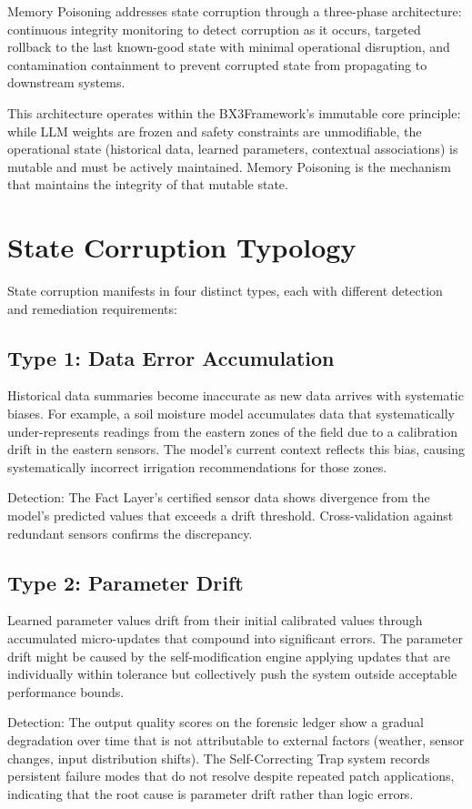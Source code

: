\documentclass[12pt]{article}
\def\bxthree{BX3}
\begin{document}
Memory Poisoning addresses state corruption through a three-phase architecture: continuous integrity monitoring to detect corruption as it occurs, targeted rollback to the last known-good state with minimal operational disruption, and contamination containment to prevent corrupted state from propagating to downstream systems.

This architecture operates within the \bxthree Framework's immutable core principle: while LLM weights are frozen and safety constraints are unmodifiable, the operational state (historical data, learned parameters, contextual associations) is mutable and must be actively maintained. Memory Poisoning is the mechanism that maintains the integrity of that mutable state.

\section{State Corruption Typology}
State corruption manifests in four distinct types, each with different detection and remediation requirements:

\subsection{Type 1: Data Error Accumulation}
Historical data summaries become inaccurate as new data arrives with systematic biases. For example, a soil moisture model accumulates data that systematically under-represents readings from the eastern zones of the field due to a calibration drift in the eastern sensors. The model's current context reflects this bias, causing systematically incorrect irrigation recommendations for those zones.

Detection: The Fact Layer's certified sensor data shows divergence from the model's predicted values that exceeds a drift threshold. Cross-validation against redundant sensors confirms the discrepancy.

\subsection{Type 2: Parameter Drift}
Learned parameter values drift from their initial calibrated values through accumulated micro-updates that compound into significant errors. The parameter drift might be caused by the self-modification engine applying updates that are individually within tolerance but collectively push the system outside acceptable performance bounds.

Detection: The output quality scores on the forensic ledger show a gradual degradation over time that is not attributable to external factors (weather, sensor changes, input distribution shifts). The Self-Correcting Trap system records persistent failure modes that do not resolve despite repeated patch applications, indicating that the root cause is parameter drift rather than logic errors.
\end{document}
